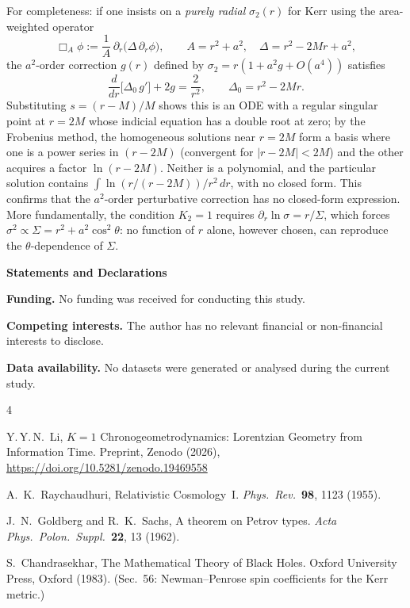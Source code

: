 \documentclass{iopart}
\begin{document}
For completeness: if one insists on a
\emph{purely radial} $\sigma_2(r)$ for Kerr using the area-weighted
operator
\begin{equation}\label{eq:boxA}
  \Box_A\phi := \frac{1}{A}\,\partial_r\!\bigl(\Delta\,\partial_r\phi\bigr),
  \qquad A=r^2+a^2,\quad \Delta=r^2-2Mr+a^2,
\end{equation}
the $a^2$-order correction $g(r)$ defined by
$\sigma_2=r(1+a^2 g+O(a^4))$ satisfies
\begin{equation}
  \frac{d}{dr}\!\bigl[\Delta_0\,g'\bigr]+2g=\frac{2}{r^2},
  \qquad \Delta_0=r^2-2Mr.
\end{equation}
Substituting $s=(r-M)/M$ shows this is an ODE with a
regular singular point at $r=2M$ whose indicial equation
has a double root at zero; by the Frobenius method, the
homogeneous solutions near $r=2M$ form a basis where one is
a power series in $(r-2M)$ (convergent for $|r-2M|<2M$) and
the other acquires a factor $\ln(r-2M)$.
Neither is a polynomial, and the particular solution contains
$\int\!\ln(r/(r{-}2M))/r^2\,dr$, with no closed form.
This confirms that the $a^2$-order perturbative correction
has no closed-form expression.
More fundamentally, the condition $K_2{=}1$ requires
$\partial_r\ln\sigma = r/\Sigma$,
which forces $\sigma^2\propto\Sigma=r^2+a^2\cos^2\!\theta$:
no function of $r$ alone, however chosen, can reproduce the
$\theta$-dependence of $\Sigma$.

\bigskip
\noindent\textbf{Statements and Declarations}

\medskip\noindent\textbf{Funding.}
No funding was received for conducting this study.

\medskip\noindent\textbf{Competing interests.}
The author has no relevant financial or non-financial interests
to disclose.

\medskip\noindent\textbf{Data availability.}
No datasets were generated or analysed during the current study.

\begin{thebibliography}{4}

Y.\,Y.\,N.~Li,
$K{=}1$ Chronogeometrodynamics: Lorentzian Geometry from
Information Time.
Preprint, Zenodo (2026), \url{https://doi.org/10.5281/zenodo.19469558}

A.~K.~Raychaudhuri,
Relativistic Cosmology~I.
\textit{Phys.\ Rev.}\ \textbf{98}, 1123 (1955).

J.~N.~Goldberg and R.~K.~Sachs,
A theorem on Petrov types.
\textit{Acta Phys.\ Polon.\ Suppl.}\ \textbf{22}, 13 (1962).

S.~Chandrasekhar,
The Mathematical Theory of Black Holes.
Oxford University Press, Oxford (1983).
(Sec.~56: Newman--Penrose spin coefficients for the Kerr metric.)

\end{thebibliography}
\end{document}
